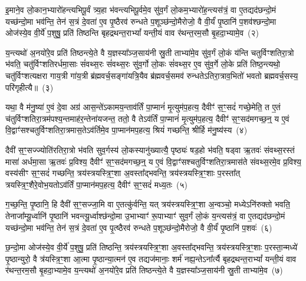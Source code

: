 इ॒माने॒व लो॒कान॒भ्यारो॑हन्त्यभिपू॒र्वं त्र्य॒हा भ॑वन्त्यभिपू॒र्वमे॒व सु॑व॒र्गं लो॒कम॒भ्यारो॑ह॒न्त्यस॑त्रं॒ वा ए॒तद्यद॑छन्दो॒मं यच्छ॑न्दो॒मा भव॑न्ति॒ तेन॑ स॒त्रं दे॒वता॑ ए॒व पृ॒ष्ठैरव॑ रुन्धते प॒शूञ्छ॑न्दो॒मैरोजो॒ वै वी॒र्यं॑ पृ॒ष्ठानि॑ प॒शव॑श्छन्दो॒मा ओज॑स्ये॒व वी॒र्ये॑ प॒शुषु॒ प्रति॑ तिष्ठन्ति बृहद्रथन्त॒रा\-भ्यां᳚ यन्ती॒यं वाव र॑थन्त॒रम॒सौ बृ॒हदा॒भ्यामे॒व~(२)\ip

य॒न्त्यथो॑ अ॒नयो॑रे॒व प्रति॑ तिष्ठन्त्ये॒ते वै य॒ज्ञस्या᳚ञ्ज॒साय॑नी स्रु॒ती ताभ्या॑मे॒व सु॑व॒र्गं लो॒कं य॑न्ति चतुर्विꣳशतिरा॒त्रो भ॑वति॒ चतु॑र्विꣳशतिरर्धमा॒साः सं॑वथ्स॒रः सं॑वथ्स॒रः सु॑व॒र्गो लो॒कः सं॑वथ्स॒र ए॒व सु॑व॒र्गे लो॒के प्रति॑ तिष्ठ॒न्त्यथो॒ चतु॑र्विꣳशत्यक्षरा गाय॒त्री गा॑य॒त्री ब्र॑ह्मवर्च॒सङ्गा॑यत्रि॒यैव ब्र॑ह्मवर्च॒समव॑ रुन्धते\-ऽतिरा॒त्राव॒भितो॑ भवतो ब्रह्मवर्च॒सस्य॒ परि॑गृहीत्यै॥~(३)\ip

{\anuvakamend[{अ॒सावायु॑रा॒भ्यामे॒व पञ्च॑चत्वारिꣳशच्च}]}

यथा॒ वै म॑नु॒ष्या॑ ए॒वं दे॒वा अग्र॑ आस॒न्ते॑\-ऽकामय॒न्ताव॑र्तिं पा॒प्मानं॑ मृ॒त्युम॑प॒हत्य॒ दैवीꣳ॑ स॒ꣳ॒सदं॑ गच्छे॒मेति॒ त ए॒तं च॑तुर्विꣳशतिरा॒त्रम॑पश्य॒न्तमाह॑र॒न्तेना॑यजन्त॒ ततो॒ वै ते\-ऽव॑र्तिं पा॒प्मानं॑ मृ॒त्युम॑प॒हत्य॒ दैवीꣳ॑ स॒ꣳ॒सद॑मगच्छ॒न्॒ य ए॒वं वि॒द्वाꣳ॑सश्चतुर्विꣳशतिरा॒त्रमास॒ते\-ऽव॑र्तिमे॒व पा॒प्मान॑मप॒हत्य॒ श्रियं॑ गच्छन्ति॒ श्रीर्\mbox{}हि म॑नु॒ष्य॑स्य~(४)\ip

दैवी॑ स॒ꣳ॒सज्ज्योति॑रतिरा॒त्रो भ॑वति सुव॒र्गस्य॑ लो॒कस्यानु॑ख्यात्यै॒ पृष्ठ्यः॑ षड॒हो भ॑वति॒ षड्वा ऋ॒तवः॑ संवथ्स॒रस्तं मासा॑ अर्धमा॒सा ऋ॒तवः॑ प्र॒विश्य॒ दैवीꣳ॑ स॒ꣳ॒सद॑मगच्छ॒न्॒ य ए॒वं वि॒द्वाꣳ॑सश्चतुर्विꣳशतिरा॒त्रमास॑ते संवथ्स॒रमे॒व प्र॒विश्य॒ वस्य॑सीꣳ स॒ꣳ॒सदं॑ गच्छन्ति॒ त्रय॑स्त्रयस्त्रि॒ꣳ॒शा अ॒वस्ता᳚द्भवन्ति॒ त्रय॑स्त्रयस्त्रि॒ꣳ॒शाः प॒रस्ता᳚त् त्रयस्त्रि॒ꣳ॒शैरे॒वोभ॒यतो\-ऽव॑र्तिं पा॒प्मान॑मप॒हत्य॒ दैवीꣳ॑ स॒ꣳ॒सदं॑ मध्य॒तः~(५)\ip

ग॒च्छ॒न्ति॒ पृ॒ष्ठानि॒ हि दैवी॑ स॒ꣳ॒सज्जा॒मि वा ए॒तत्कु॑र्वन्ति॒ यत् त्रय॑स्त्रयस्त्रि॒ꣳ॒शा अ॒न्वञ्चो॒ मध्ये\-ऽनि॑रुक्तो भवति॒ तेनाजा᳚म्यू॒र्ध्वानि॑ पृ॒ष्ठानि॑ भवन्त्यू॒र्ध्वाश्छ॑न्दो॒मा उ॒भाभ्याꣳ॑ रू॒पाभ्याꣳ॑ सुव॒र्गं लो॒कं य॒न्त्यस॑त्रं॒ वा ए॒तद्यद॑छन्दो॒मं यच्छ॑न्दो॒मा भव॑न्ति॒ तेन॑ स॒त्रं दे॒वता॑ ए॒व पृ॒त्ष्ठैरव॑ रुन्धते प॒शूञ्छ॑न्दो॒मैरोजो॒ वै वी॒र्यं॑ पृ॒ष्ठानि॑ प॒शवः॑~(६)\ip

छ॒न्दो॒मा ओज॑स्ये॒व वी॒र्ये॑ प॒शुषु॒ प्रति॑ तिष्ठन्ति॒ त्रय॑स्त्रयस्त्रि॒ꣳ॒शा अ॒वस्ता᳚द्भवन्ति॒ त्रय॑स्त्रयस्त्रि॒ꣳ॒शाः प॒रस्ता॒न्मध्ये॑ पृ॒ष्ठान्युरो॒ वै त्र॑यस्त्रि॒ꣳ॒शा आ॒त्मा पृ॒ष्ठान्या॒त्मन॑ ए॒व तद्यज॑मानाः॒ शर्म॑ नह्य॒न्ते\-ऽना᳚र्त्यै बृहद्रथन्त॒रा\-भ्यां᳚ यन्ती॒यं वाव र॑थन्त॒रम॒सौ बृ॒हदा॒भ्यामे॒व य॒न्त्यथो॑ अ॒नयो॑रे॒व प्रति॑ तिष्ठन्त्ये॒ते वै य॒ज्ञस्या᳚ञ्ज॒साय॑नी स्रु॒ती ताभ्या॑मे॒व~(७)\ip

